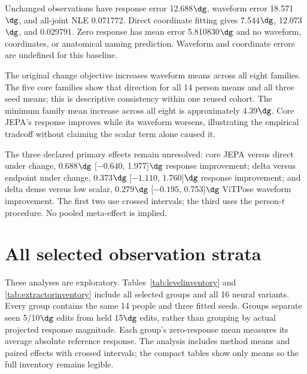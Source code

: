 \begin{table}[h]\centering\small
\caption{All 16 neural variants. Response and waveform are in degrees, NLE is dimensionless, Fail is the weighted response failure percentage, and Assign is geometric assignment failure percentage. Means use 14 people and three seeds. All are lower-is-better outcomes, but they have different support and cannot be combined into an unspecified overall ranking.}
\label{tab:inventory}
\setlength{\tabcolsep}{4pt}
\end{table}

Unchanged observations have response error 12.688$\dg$, waveform error 18.571$\dg$, and all-joint NLE 0.071772. Direct coordinate fitting gives 7.544$\dg$, 12.073$\dg$, and 0.029791. Zero response has mean error 5.810830$\dg$ and no waveform, coordinates, or anatomical naming prediction. Waveform and coordinate errors are undefined for this baseline.

The original change objective increases waveform means across all eight families. The five core families show that direction for all 14 person means and all three seed means; this is descriptive consistency within one reused cohort. The minimum family mean increase across all eight is approximately 4.39$\dg$. Core JEPA's response improves while its waveform worsens, illustrating the empirical tradeoff without claiming the scalar term alone caused it.

The three declared primary effects remain unresolved: core JEPA versus direct under change, 0.688$\dg$ [$-0.640$, 1.977]$\dg$ response improvement; delta versus endpoint under change, 0.373$\dg$ [$-1.110$, 1.760]$\dg$ response improvement; and delta dense versus low scalar, 0.279$\dg$ [$-0.195$, 0.753]$\dg$ ViTPose waveform improvement. The first two use crossed intervals; the third uses the person-$t$ procedure. No pooled meta-effect is implied.

\clearpage
\section{All selected observation strata}
\label{app:strata}
These analyses are exploratory. Tables~\ref{tab:levelinventory} and \ref{tab:extractorinventory} include all selected groups and all 16 neural variants. Every group contains the same 14 people and three fitted seeds. Groups separate seen 5/10$\dg$ edits from held 15$\dg$ edits, rather than grouping by actual projected response magnitude. Each group's zero-response mean measures its average absolute reference response. The analysis includes method means and paired effects with crossed intervals; the compact tables show only means so the full inventory remains legible.


